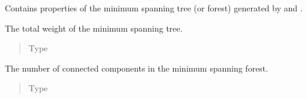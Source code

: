 \documentclass[letterpaper,10pt,english]{sphinxmanual}
\begin{document}

\begin{fulllineitems}
\label{\detokenize{documentation:tmap.GraphProperties}}
Contains properties of the minimum spanning tree (or forest) generated by {\hyperref[\detokenize{documentation:tmap.layout_from_lsh_forest}]{}} and {\hyperref[\detokenize{documentation:tmap.layout_from_edge_list}]{}}.

\begin{fulllineitems}
\label{\detokenize{documentation:tmap.GraphProperties.mst_weight}}
The total weight of the minimum spanning tree.
\begin{quote}\begin{description}
\item[{Type}] \leavevmode
{}

\end{description}\end{quote}

\end{fulllineitems}


\begin{fulllineitems}
\label{\detokenize{documentation:tmap.GraphProperties.n_connected_components}}
The number of connected components in the minimum spanning forest.
\begin{quote}\begin{description}
\item[{Type}] \leavevmode
{}

\end{description}\end{quote}


\end{fulllineitems}
\end{fulllineitems}
\end{document}
